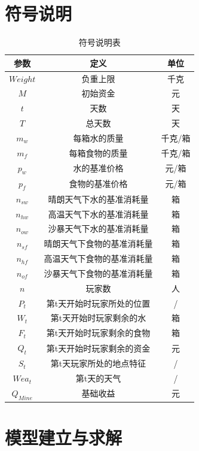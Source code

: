 \documentclass[withoutpre]{cumcmthesis} %
\begin{document}
\section{符号说明}
\begin{table}[H]
    \caption{符号说明表}\label{tab:001} \centering
    \begin{tabular}{ccc}
        \toprule[1.5pt]
        \textbf{参数} & \textbf{定义} & \textbf{单位}\\
        \midrule[1pt]
        $Weight$ & 负重上限 & 千克\\ 
        $M$ & 初始资金 & 元 \\
        $t$ & 天数 & 天\\
        $T$ & 总天数 & 天\\
        $m_w$ & 每箱水的质量 & 千克/箱\\
        $m_f$ & 每箱食物的质量 & 千克/箱 \\
        $p_w$ & 水的基准价格 & 元/箱\\
        $p_f$ & 食物的基准价格 & 元/箱\\
        $n_{sw}$ & 晴朗天气下水的基准消耗量 & 箱\\
        $n_{hw}$ & 高温天气下水的基准消耗量 & 箱\\
        $n_{ow}$ & 沙暴天气下水的基准消耗量 & 箱\\
        $n_{sf}$ & 晴朗天气下食物的基准消耗量 & 箱\\
        $n_{hf}$ & 高温天气下食物的基准消耗量 & 箱\\
        $n_{of}$ & 沙暴天气下食物的基准消耗量 & 箱\\
        $n$ & 玩家数 & 人 \\
        $P_{t}$ & 第t天开始时玩家所处的位置 & / \\
        $W_{t}$ & 第t天开始时玩家剩余的水 & 箱 \\
        $F_{t}$ & 第t天开始时玩家剩余的食物 & 箱 \\ 
        $Q_{t}$ & 第t天开始时玩家剩余的资金 & 元 \\
        $S_{t}$ & 第t天玩家所处的地点特征 & /\\
        $Wea_t$ & 第t天的天气 & /\\
        $Q_{Mine}$ & 基础收益 & 元\\
        
        \bottomrule[1.5pt]
    \end{tabular}
\end{table}


\section{模型建立与求解}
\end{document}
